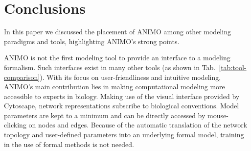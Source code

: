 \documentclass{bmcart}
\begin{document}
\section*{Conclusions}
%
%

In this paper we discussed the placement of ANIMO among other modeling paradigms and tools,
highlighting ANIMO's strong points.

ANIMO is not the first modeling tool to provide an interface to a
modeling formalism. Such interfaces exist in many other tools (as shown in Tab.~\ref{tab:tool-comparison}). With its
focus on user-friendliness and intuitive modeling, ANIMO's main contribution lies
in making computational modeling more accessible to experts in biology.
Making use of the visual
interface provided by Cytoscape, network representations subscribe to biological conventions.
Model parameters are kept to a minimum and can be directly accessed by mouse-clicking on
nodes and edges. Because of the automatic translation of the network topology and
user-defined parameters into an underlying formal model, training in the use of formal methods
is not needed.
\end{document}
